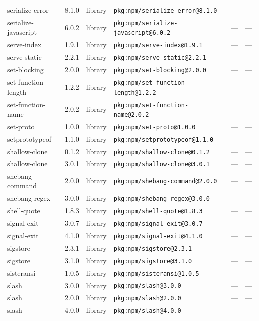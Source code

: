 \documentclass[11pt]{article}
\begin{document}
\begin{longtable}{|l|l|l|p{2.2cm}|l|p{4cm}|}
serialize-error & 8.1.0 & library & \texttt{pkg:npm/serialize-error@8.1.0} & — & — \\
serialize-javascript & 6.0.2 & library & \texttt{pkg:npm/serialize-javascript@6.0.2} & — & — \\
serve-index & 1.9.1 & library & \texttt{pkg:npm/serve-index@1.9.1} & — & — \\
serve-static & 2.2.1 & library & \texttt{pkg:npm/serve-static@2.2.1} & — & — \\
set-blocking & 2.0.0 & library & \texttt{pkg:npm/set-blocking@2.0.0} & — & — \\
set-function-length & 1.2.2 & library & \texttt{pkg:npm/set-function-length@1.2.2} & — & — \\
set-function-name & 2.0.2 & library & \texttt{pkg:npm/set-function-name@2.0.2} & — & — \\
set-proto & 1.0.0 & library & \texttt{pkg:npm/set-proto@1.0.0} & — & — \\
setprototypeof & 1.1.0 & library & \texttt{pkg:npm/setprototypeof@1.1.0} & — & — \\
shallow-clone & 0.1.2 & library & \texttt{pkg:npm/shallow-clone@0.1.2} & — & — \\
shallow-clone & 3.0.1 & library & \texttt{pkg:npm/shallow-clone@3.0.1} & — & — \\
shebang-command & 2.0.0 & library & \texttt{pkg:npm/shebang-command@2.0.0} & — & — \\
shebang-regex & 3.0.0 & library & \texttt{pkg:npm/shebang-regex@3.0.0} & — & — \\
shell-quote & 1.8.3 & library & \texttt{pkg:npm/shell-quote@1.8.3} & — & — \\
signal-exit & 3.0.7 & library & \texttt{pkg:npm/signal-exit@3.0.7} & — & — \\
signal-exit & 4.1.0 & library & \texttt{pkg:npm/signal-exit@4.1.0} & — & — \\
sigstore & 2.3.1 & library & \texttt{pkg:npm/sigstore@2.3.1} & — & — \\
sigstore & 3.1.0 & library & \texttt{pkg:npm/sigstore@3.1.0} & — & — \\
sisteransi & 1.0.5 & library & \texttt{pkg:npm/sisteransi@1.0.5} & — & — \\
slash & 3.0.0 & library & \texttt{pkg:npm/slash@3.0.0} & — & — \\
slash & 2.0.0 & library & \texttt{pkg:npm/slash@2.0.0} & — & — \\
slash & 4.0.0 & library & \texttt{pkg:npm/slash@4.0.0} & — & — \\

\end{longtable}
\end{document}
